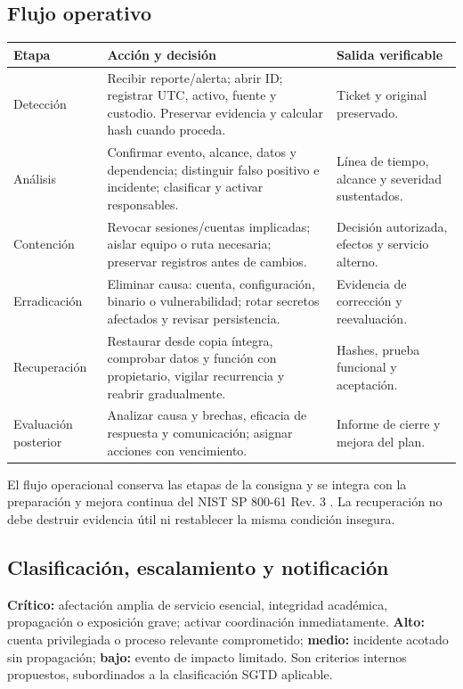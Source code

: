 \documentclass[10pt,a4paper]{article}
\newcommand{\cabecera}[1]{\textbf{#1}}
\begin{document}
\subsection{Flujo operativo}
\begin{TablaCompacta}
\begin{longtable}{P{28mm}P{84mm}P{47mm}}
\toprule\cabecera{Etapa} & \cabecera{Acción y decisión} & \cabecera{Salida verificable}\\\midrule\endhead
Detección & Recibir reporte/alerta; abrir ID; registrar UTC, activo, fuente y custodio. Preservar evidencia y calcular hash cuando proceda. & Ticket y original preservado.\\
Análisis & Confirmar evento, alcance, datos y dependencia; distinguir falso positivo e incidente; clasificar y activar responsables. & Línea de tiempo, alcance y severidad sustentados.\\
Contención & Revocar sesiones/cuentas implicadas; aislar equipo o ruta necesaria; preservar registros antes de cambios. & Decisión autorizada, efectos y servicio alterno.\\
Erradicación & Eliminar causa: cuenta, configuración, binario o vulnerabilidad; rotar secretos afectados y revisar persistencia. & Evidencia de corrección y reevaluación.\\
Recuperación & Restaurar desde copia íntegra, comprobar datos y función con propietario, vigilar recurrencia y reabrir gradualmente. & Hashes, prueba funcional y aceptación.\\
Evaluación posterior & Analizar causa y brechas, eficacia de respuesta y comunicación; asignar acciones con vencimiento. & Informe de cierre y mejora del plan.\\\bottomrule
\end{longtable}
\end{TablaCompacta}
El flujo operacional conserva las etapas de la consigna y se integra con la preparación y mejora continua del NIST SP 800-61 Rev. 3 \cite{R05}. La recuperación no debe destruir evidencia útil ni restablecer la misma condición insegura.

\subsection{Clasificación, escalamiento y notificación}
\textbf{Crítico:} afectación amplia de servicio esencial, integridad académica, propagación o exposición grave; activar coordinación inmediatamente. \textbf{Alto:} cuenta privilegiada o proceso relevante comprometido; \textbf{medio:} incidente acotado sin propagación; \textbf{bajo:} evento de impacto limitado. Son criterios internos propuestos, subordinados a la clasificación SGTD aplicable.
\end{document}
